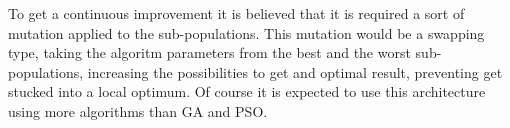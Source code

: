 \documentclass[runningheads]{llncs}
\begin{document}
To get a continuous improvement it is believed that it is required a sort of mutation applied to the 
sub-populations. This mutation would be a swapping type, taking the algoritm parameters from the best and the worst 
sub-populations, increasing the possibilities to get and optimal result, preventing get stucked into a local optimum.
Of course it is expected to use this architecture using more algorithms than GA and PSO.



      
      
    
    
    
    
    
    
    
    
\end{document}
